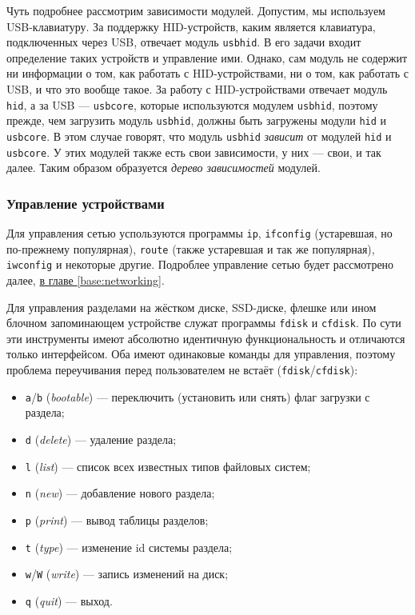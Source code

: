 Чуть подробнее рассмотрим зависимости модулей. Допустим, мы используем USB-клавиатуру. За поддержку HID-устройств, каким является клавиатура, подключенных через USB, отвечает модуль \texttt{usbhid}. В его задачи входит определение таких устройств и управление ими. Однако, сам модуль не содержит ни информации о том, как работать с HID-устройствами, ни о том, как работать с USB, и что это вообще такое.
За работу с HID-устройствами отвечает модуль \texttt{hid}, а за USB --- \texttt{usbcore}, которые используются модулем \texttt{usbhid}, поэтому прежде, чем загрузить модуль \texttt{usbhid}, должны быть загружены модули \texttt{hid} и \texttt{usbcore}. В этом случае говорят, что модуль \texttt{usbhid} \emph{зависит} от модулей \texttt{hid} и \texttt{usbcore}. У этих модулей также есть свои зависимости, у них --- свои, и так далее. Таким образом образуется \emph{дерево зависимостей} модулей.

\subsubsection{Управление устройствами}\label{base:os:structure:sysutils:devices}
Для управления сетью успользуются программы \texttt{ip}, \texttt{ifconfig} (устаревшая, но по-прежнему популярная), \texttt{route} (также устаревшая и так же популярная), \texttt{iwconfig} и некоторые другие. Подроблее управление сетью будет рассмотрено далее, \hyperref[base:networking]{в главе \ref*{base:networking}}.

Для управления разделами на жёстком диске, SSD-диске, флешке или ином блочном запоминающем устройстве служат программы \texttt{fdisk} и \texttt{cfdisk}. По сути эти инструменты имеют абсолютно идентичную функциональность и отличаются только интерфейсом. Оба имеют одинаковые команды для управления, поэтому проблема переучивания перед пользователем не встаёт (\texttt{fdisk}/\texttt{cfdisk}):
\begin{itemize}
 \item \texttt{a}/\texttt{b} (\emph{bootable}) --- переключить (установить или снять) флаг загрузки с раздела;
 \item \texttt{d} (\emph{delete}) --- удаление раздела;
 \item \texttt{l} (\emph{list}) --- список всех известных типов файловых систем;
 \item \texttt{n} (\emph{new}) --- добавление нового раздела;
 \item \texttt{p} (\emph{print}) --- вывод таблицы разделов;
 \item \texttt{t} (\emph{type}) --- изменение id системы раздела;
 \item \texttt{w}/\texttt{W} (\emph{write}) --- запись изменений на диск;
 \item \texttt{q} (\emph{quit}) --- выход.
\end{itemize}
 

